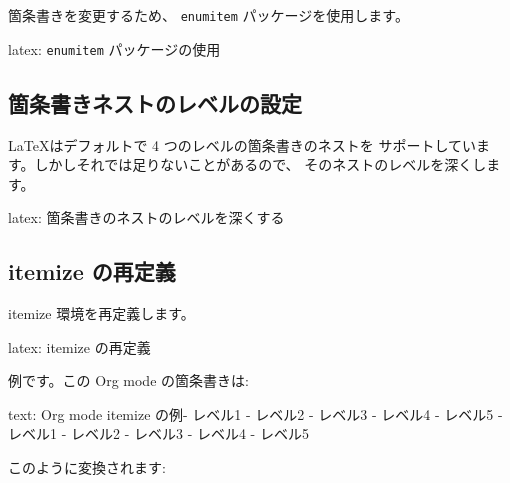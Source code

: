 \documentclass[dvipdfmx,a4j,14pt,uplatex,openany]{jsbook}
\begin{document}
箇条書きを変更するため、 \texttt{enumitem} パッケージを使用します。

\begin{programlist}[label={org2081401}]{latex}{: \texttt{enumitem} パッケージの使用}\usepackage{enumitem}
\end{programlist}


\subsection{箇条書きネストのレベルの設定}
\label{sec:orgab4490b}
\LaTeX はデフォルトで 4 つのレベルの箇条書きのネストを
サポートしています。しかしそれでは足りないことがあるので、
そのネストのレベルを深くします。

\begin{programlist}[label={org7a11307}]{latex}{: 箇条書きのネストのレベルを深くする}
\end{programlist}

\subsection{itemize の再定義}
\label{sec:org1c24aa7}
itemize 環境を再定義します。

\begin{programlist}[label={org4cc5d20}]{latex}{: itemize の再定義}
\end{programlist}

例です。この Org mode の箇条書きは:

\begin{programlist}[label={orgbd2fa0b}]{text}{: Org mode itemize の例}- レベル1
  - レベル2
    - レベル3
      - レベル4
        - レベル5
- レベル1
  - レベル2
    - レベル3
      - レベル4
        - レベル5
\end{programlist}

このように変換されます:
\end{document}
